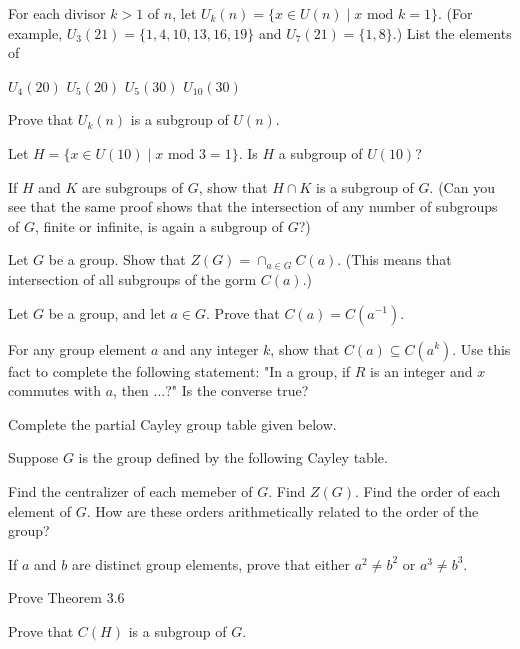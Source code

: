 \documentclass[11pt,largemargins]{homework}
\begin{document}
\question
For each divisor $k>1$ of $n$, let $U_k(n)=\{x\in U(n) \;|\; x \text{ mod } k = 1\}$. 
(For example, $U_3(21)=\{1,4,10,13,16,19\}$ and $U_7(21)=\{1,8\}$.)
List the elements of 
\begin{alphaparts}
    \questionpart
    $U_4(20)$
    \questionpart
    $U_5(20)$
    \questionpart
    $U_5(30)$
    \questionpart
    $U_{10}(30)$

\end{alphaparts}

Prove that $U_k(n)$ is a subgroup of $U(n)$. 

Let $H=\{x\in U(10)\;|\; x\text{ mod }3=1\}$. Is $H$ a subgroup of $U(10)$? 

\question
If $H$ and $K$ are subgroups of $G$, show that $H\cap K$ is a subgroup of $G$. (Can you see that the same proof shows that the 
intersection of any number of subgroups of $G$, finite or infinite, is again a subgroup of $G$?)

\question
Let $G$ be a group. Show that $Z(G)= \cap_{a\in G}C(a)$. (This means that intersection of all subgroups 
of the gorm $C(a)$.)

\question
Let $G$ be a group, and let $a\in G$. Prove that $C(a)=C(a^{-1})$.

\question
For any group element $a$ and any integer $k$, show that $C(a)\subseteq C(a^k)$.
Use this fact to complete the following statement: "In a group, if $R$ is an integer and $x$ commutes with $a$, then ...?"
Is the converse true?

\question
Complete the partial Cayley group table given below.

\question
Suppose $G$ is the group defined by the following Cayley table.

\begin{alphaparts}
    \questionpart
    Find the centralizer of each memeber of $G$.
    \questionpart
    Find $Z(G)$.
    \questionpart
    Find the order of each element of $G$. How are these orders arithmetically related to the order of the group?
\end{alphaparts}

\question
If $a$ and $b$ are distinct group elements, prove that either $a^2\neq b^2$ or $a^3\neq b^3$.

\question
Prove Theorem 3.6

\question
Prove that $C(H)$ is a subgroup of $G$.
\end{document}
